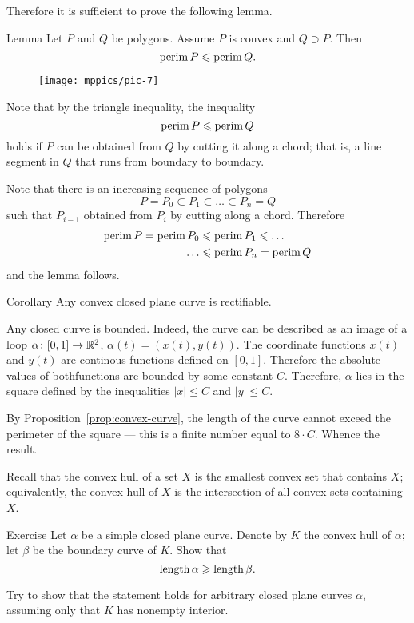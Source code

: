 Therefore it is sufficient to prove the following lemma.


\begin{thm}{Lemma}\label{lem:perimeter}
Let $P$ and $Q$ be polygons.
Assume $P$ is convex and $Q\supset P$.
Then 
\[\mathop{\rm perim}\nolimits P\leqslant \mathop{\rm perim}\nolimits Q.\]

\end{thm}


\begin{wrapfigure}{o}{24 mm}
\vskip-2mm
\centering
\texttt{[image: mppics/pic-7]}
\vskip2mm
\end{wrapfigure}

Note that by the triangle inequality,
the inequality
\[\mathop{\rm perim}\nolimits P\leqslant \mathop{\rm perim}\nolimits Q\]
holds
if $P$ can be obtained from $Q$ by cutting it along a chord;
that is, a line segment in $Q$ that runs from boundary to boundary.

Note that there is an increasing sequence of polygons 
$$P=P_0\subset P_1\subset\dots\subset P_n=Q$$
such that $P_{i-1}$ obtained from $P_{i}$ by cutting along a chord.
Therefore 
\begin{align*}
\mathop{\rm perim}\nolimits P=\mathop{\rm perim}\nolimits P_0&\leqslant\mathop{\rm perim}\nolimits P_1\leqslant\dots
\\
\dots&\leqslant\mathop{\rm perim}\nolimits P_n=\mathop{\rm perim}\nolimits Q
\end{align*}
and the lemma follows.
\qeds

\begin{thm}{Corollary}\label{cor:convex=>rectifiable}
Any convex closed plane curve is rectifiable.  
\end{thm}

Any closed curve is bounded.
Indeed, the curve can be described as an image of a loop $\alpha\colon[0,1]\to\mathbb{R}^2$, $\alpha(t)=(x(t),y(t))$.
The coordinate functions $x(t)$ and $y(t)$ are continous functions defined on $[0,1]$.
Therefore the absolute values of bothfunctions are bounded by some constant $C$.
Therefore, $\alpha$ lies in the square defined by the inequalities $|x|\le C$ and $|y|\le C$.


By Proposition~\ref{prop:convex-curve}, the length of the curve cannot exceed the perimeter of the square --- this is a finite number equal to $8\cdot C$. 
Whence the result.
\qeds

Recall that the convex hull of a set $X$ is the smallest convex set that contains $X$; equivalently, the convex hull of $X$ is the intersection of all convex sets containing $X$.

\begin{thm}{Exercise}\label{ex:convex-hull}
Let $\alpha$ be a simple closed plane curve.
Denote by $K$ the convex hull of $\alpha$; let $\beta$ be the boundary curve of $K$.
Show that 
\[\mathop{\rm length}\nolimits \alpha\geqslant \mathop{\rm length}\nolimits \beta.\]

Try to show that the statement holds for arbitrary closed plane curves $\alpha$, assuming only that $K$ has nonempty interior.
\end{thm}



